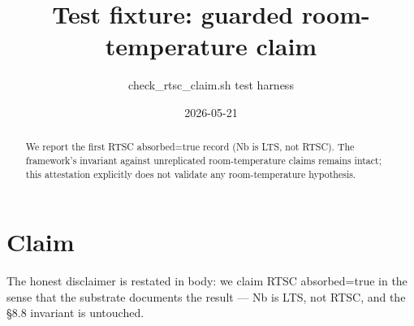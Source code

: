 \documentclass[11pt,a4paper]{article}
\title{Test fixture: guarded room-temperature claim}
\author{check_rtsc_claim.sh test harness}
\date{2026-05-21}
\begin{document}
\maketitle

\begin{abstract}
We report the first RTSC absorbed=true record (Nb is LTS, not RTSC).
The framework's invariant against unreplicated room-temperature claims
remains intact; this attestation explicitly does not validate any
room-temperature hypothesis.
\end{abstract}

\section{Claim}
The honest disclaimer is restated in body: we claim RTSC absorbed=true
in the sense that the substrate documents the result — Nb is LTS, not
RTSC, and the §8.8 invariant is untouched.
\end{document}
